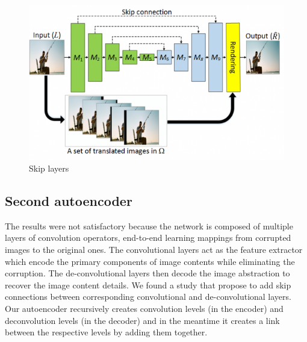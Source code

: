 \documentclass[%
 reprint,
 amsmath,amssymb,
 aps,
]{revtex4-1}
\begin{document}
\begin{figure}[!ht]
	\centering
	\includegraphics[width=0.8\columnwidth]{skip}
	\caption{Skip layers}
	\centering
	\label{Skip layers}
\end{figure}



\subsection{Second autoencoder} 
The results were not satisfactory because the network is composed of multiple layers of convolution operators, end-to-end learning mappings from corrupted images to the original ones. The convolutional layers act as the feature extractor which encode the primary components of image contents while eliminating the corruption. The de-convolutional layers then decode the image abstraction to recover the image content details.  We found a study that propose to add skip connections between corresponding convolutional and de-convolutional layers. 
Our autoencoder recursively creates convolution levels (in the encoder) and deconvolution levels (in the decoder) and in the meantime it creates a link between the respective levels by adding them together.
\end{document}
